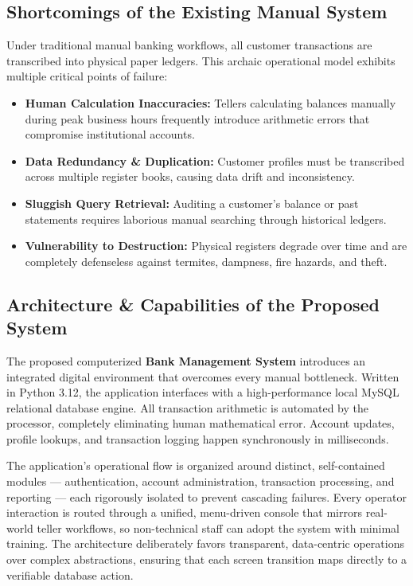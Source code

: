 \documentclass[12pt,a4paper]{article}
\begin{document}
\subsection*{Shortcomings of the Existing Manual System}
Under traditional manual banking workflows, all customer transactions are transcribed into physical paper ledgers. This archaic operational model exhibits multiple critical points of failure:
\begin{itemize}
    \item \textbf{Human Calculation Inaccuracies:} Tellers calculating balances manually during peak business hours frequently introduce arithmetic errors that compromise institutional accounts.
    \item \textbf{Data Redundancy \& Duplication:} Customer profiles must be transcribed across multiple register books, causing data drift and inconsistency.
    \item \textbf{Sluggish Query Retrieval:} Auditing a customer's balance or past statements requires laborious manual searching through historical ledgers.
    \item \textbf{Vulnerability to Destruction:} Physical registers degrade over time and are completely defenseless against termites, dampness, fire hazards, and theft.
\end{itemize}

\subsection*{Architecture \& Capabilities of the Proposed System}
The proposed computerized \textbf{Bank Management System} introduces an integrated digital environment that overcomes every manual bottleneck. Written in Python 3.12, the application interfaces with a high-performance local MySQL relational database engine. All transaction arithmetic is automated by the processor, completely eliminating human mathematical error. Account updates, profile lookups, and transaction logging happen synchronously in milliseconds.

The application's operational flow is organized around distinct, self-contained modules --- authentication, account administration, transaction processing, and reporting --- each rigorously isolated to prevent cascading failures. Every operator interaction is routed through a unified, menu-driven console that mirrors real-world teller workflows, so non-technical staff can adopt the system with minimal training. The architecture deliberately favors transparent, data-centric operations over complex abstractions, ensuring that each screen transition maps directly to a verifiable database action.
\end{document}
